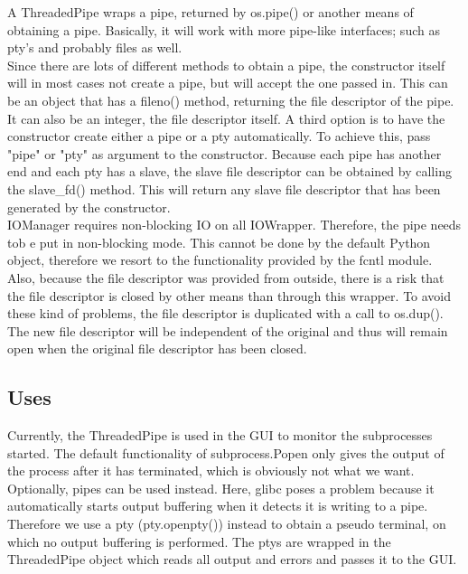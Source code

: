 \documentclass[a4paper, 10pt, oneside]{article}
\begin{document}
A ThreadedPipe wraps a pipe, returned by os.pipe() or another means of obtaining
a pipe. Basically, it will work with more pipe-like interfaces; such as pty's
and probably files as well. \\

Since there are lots of different methods to obtain a pipe, the constructor
itself will in most cases not create a pipe, but will accept the one passed in.
This can be an object that has a fileno() method, returning the file descriptor
of the pipe. It can also be an integer, the file descriptor itself. A third
option is to have the constructor create either a pipe or a pty automatically.
To achieve this, pass "pipe" or "pty" as argument to the constructor. Because
each pipe has another end and each pty has a slave, the slave file descriptor
can be obtained by calling the slave\_fd() method. This will return any slave
file descriptor that has been generated by the constructor.\\

IOManager requires non-blocking IO on all IOWrapper. Therefore, the pipe needs
tob e put in non-blocking mode. This cannot be done by the default Python
object, therefore we resort to the functionality provided by the fcntl module.
Also, because the file descriptor was provided from outside, there is a risk
that the file descriptor is closed by other means than through this wrapper. To
avoid these kind of problems, the file descriptor is duplicated with a call to
os.dup(). The new file descriptor will be independent of the original and thus
will remain open when the original file descriptor has been closed.

\subsection{Uses}
Currently, the ThreadedPipe is used in the GUI to monitor the subprocesses
started. The default functionality of subprocess.Popen only gives the output of
the process after it has terminated, which is obviously not what we want.
Optionally, pipes can be used instead. Here, glibc poses a problem because it
automatically starts output buffering when it detects it is writing to a pipe.
Therefore we use a pty (pty.openpty()) instead to obtain a pseudo terminal, on
which no output buffering is performed. The ptys are wrapped in the ThreadedPipe
object which reads all output and errors and passes it to the GUI.
\end{document}
